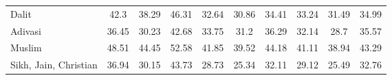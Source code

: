 \begin{tabular}{l*{9}{c}}
Dalit               &        42.3&       38.29&       46.31&       32.64&       30.86&       34.41&       33.24&       31.49&       34.99\\
Adivasi             &       36.45&       30.23&       42.68&       33.75&        31.2&       36.29&       32.14&        28.7&       35.57\\
Muslim              &       48.51&       44.45&       52.58&       41.85&       39.52&       44.18&       41.11&       38.94&       43.29\\
Sikh, Jain, Christian&       36.94&       30.15&       43.73&       28.73&       25.34&       32.11&       29.12&       25.49&       32.76\\
\bottomrule
\end{tabular}
